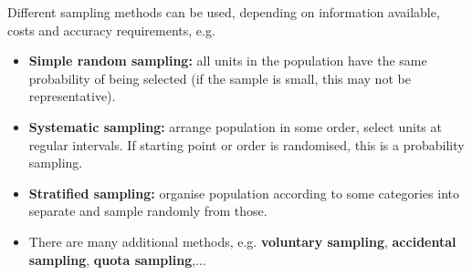 Different sampling methods can be used, depending on information available, costs and accuracy requirements, e.g.
\begin{itemize}
	\item \textbf{Simple random sampling:} all units in the population have the same probability of being selected (if the sample is small, this may not be representative).
	\item \textbf{Systematic sampling:} arrange population in some order, select units at regular intervals. If starting point or order is randomised, this is a probability sampling.
	\item \textbf{Stratified sampling:} organise population according to some categories into separate  and sample randomly from those.
	\item There are many additional methods, e.g. \textbf{voluntary sampling}, \textbf{accidental sampling}, \textbf{quota sampling},...
\end{itemize}
